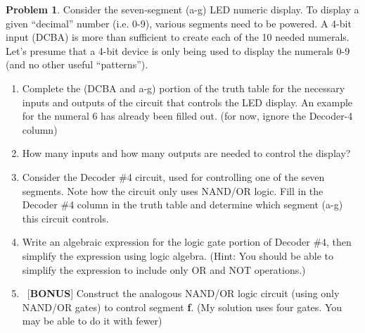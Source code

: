 \documentclass[10pt]{article}
\theoremstyle{definition}
\newtheorem{problem}{Problem}
\begin{document}
\begin{problem}
Consider the seven-segment (a-g) LED numeric display. To display a given ``decimal'' number (i.e. 0-9), various segments need to be powered.
A 4-bit input (DCBA) is more than sufficient to create each of the 10 needed numerals. Let's presume that a 4-bit device is only being used to display
the numerals 0-9 (and no other useful ``patterns'').
\begin{enumerate}[label=(\alph*)]
  \item Complete the (DCBA and a-g) portion of the truth table for the necessary inputs and outputs of the circuit that controls the LED display.
        An example for the numeral 6 has already been filled out. (for now, ignore the Decoder-4 column)
  \item How many inputs and how many outputs are needed to control the display?
  \item Consider the Decoder \#4 circuit, used for controlling one of the seven segments. Note how the circuit only uses NAND/OR logic.
        Fill in the Decoder \#4 column in the truth table and determine which segment (a-g) this circuit controls.
  \item Write an algebraic expression for the logic gate portion of Decoder \#4, then simplify the expression using logic algebra.
        (Hint: You should be able to simplify the expression to include only OR and NOT operations.)
  \item ~[\textbf{BONUS}] Construct the analogous NAND/OR logic circuit (using only NAND/OR gates) to control segment \textbf{f}. (My solution uses four gates. You may be able to do it with fewer)
\end{enumerate}
\end{problem}
\end{document}
